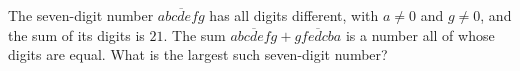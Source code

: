 The seven-digit number $\overline{abcdefg}$ has all digits different, with $a\ne0$ and $g\ne0$, and the sum of its digits is $21$. The sum $\overline{abcdefg}+\overline{gfedcba}$ is a number all of whose digits are equal. What is the largest such seven-digit number?
